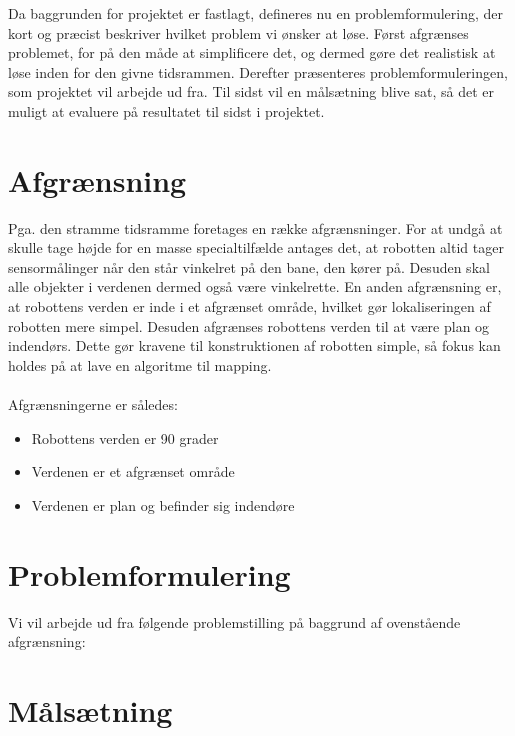 Da baggrunden for projektet er fastlagt, defineres nu en problemformulering, der kort og præcist beskriver hvilket problem vi ønsker at løse.
Først afgrænses problemet, for på den måde at simplificere det, og dermed gøre det realistisk at løse inden for den givne tidsrammen.
Derefter præsenteres problemformuleringen, som projektet vil arbejde ud fra.
Til sidst vil en målsætning blive sat, så det er muligt at evaluere på resultatet til sidst i projektet.

\section*{Afgrænsning}
Pga. den stramme tidsramme foretages en række afgrænsninger.
For at undgå at skulle tage højde for en masse specialtilfælde antages det, at robotten altid tager sensormålinger når den står vinkelret på den bane, den kører på.
Desuden skal alle objekter i verdenen dermed også være vinkelrette. 
En anden afgrænsning er, at robottens verden er inde i et afgrænset område, hvilket gør lokaliseringen af robotten mere simpel.
Desuden afgrænses robottens verden til at være plan og indendørs. 
Dette gør kravene til konstruktionen af robotten simple, så fokus kan holdes på at lave en algoritme til mapping.

\paragraph{}
 Afgrænsningerne er således:
\begin{itemize}
\item Robottens verden er 90 grader
\item Verdenen er et afgrænset område
\item Verdenen er plan og befinder sig indendøre
\end{itemize}

\section*{Problemformulering}\label{problemformulering}
Vi vil arbejde ud fra følgende problemstilling på baggrund af ovenstående afgrænsning:

\begin{samepage}


\end{samepage}

\section*{Målsætning}\label{problem:maalsaetning}
